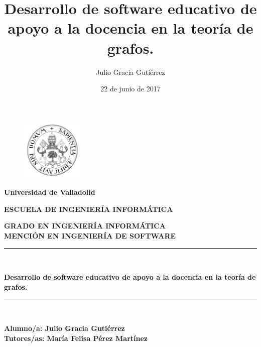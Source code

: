 \documentclass[openright,twoside,10pt]{book}
\date{22 de junio de 2017}
\author{Julio Gracia Gutiérrez}
\title{Desarrollo de software educativo de apoyo a la docencia en la teoría de
grafos.}
\begin{document}
    \begin{titlepage}
        \begin{center}
            \vspace*{-1in}
            \begin{figure}[htb]
                \begin{center}
                    \includegraphics[width=3cm]{./latex/img/logo}
                \end{center}
            \end{figure}
            \begin{large}
                \textbf{Universidad de Valladolid}
            \end{large}

            \vspace*{0.15in}
            \vspace*{0.6in}
            \begin{large}
                \textbf{ESCUELA DE INGENIERÍA INFORMÁTICA}
            \end{large}
            \vspace*{0.2in}
            \textbf{ GRADO EN INGENIERÍA INFORMÁTICA}\\
            \textbf{ MENCIÓN EN INGENIERÍA DE SOFTWARE }
            \vspace*{0.5in}
            \rule{140mm}{0.1mm}\\
            \vspace*{0.3in}
            \begin{large}
                \textbf{{\LARGE Desarrollo de software educativo de apoyo a la docencia en la teoría de
grafos.\\}}
            \end{large}
            \vspace*{0.6in}
            \rule{140mm}{0.1mm}\\
            \vspace*{2in}
            \begin{large}
                \begin{flushright}
                    \textbf{Alumno/a: Julio Gracia Gutiérrez \\
                    \vspace*{0.3in}
                    Tutores/as: María Felisa Pérez Martínez}
                \end{flushright}
            \end{large}
        \end{center}
    \end{titlepage}
\end{document}
